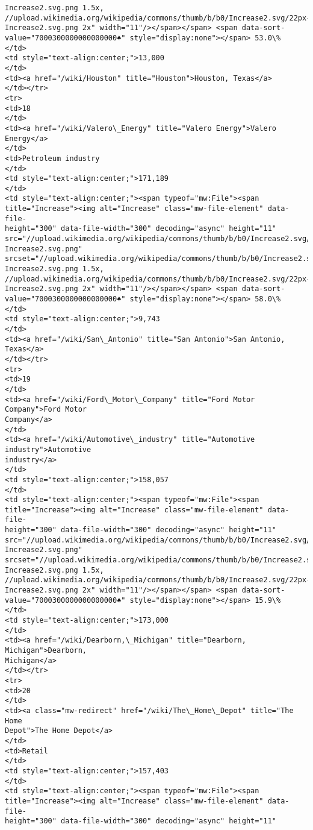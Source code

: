 \documentclass[11pt]{article}
\begin{document}
\begin{Verbatim}[commandchars=\\\{\}]
Increase2.svg.png 1.5x,
//upload.wikimedia.org/wikipedia/commons/thumb/b/b0/Increase2.svg/22px-
Increase2.svg.png 2x" width="11"/></span></span> <span data-sort-
value="7000300000000000000♠" style="display:none"></span> 53.0\%
</td>
<td style="text-align:center;">13,000
</td>
<td><a href="/wiki/Houston" title="Houston">Houston, Texas</a>
</td></tr>
<tr>
<td>18
</td>
<td><a href="/wiki/Valero\_Energy" title="Valero Energy">Valero Energy</a>
</td>
<td>Petroleum industry
</td>
<td style="text-align:center;">171,189
</td>
<td style="text-align:center;"><span typeof="mw:File"><span
title="Increase"><img alt="Increase" class="mw-file-element" data-file-
height="300" data-file-width="300" decoding="async" height="11"
src="//upload.wikimedia.org/wikipedia/commons/thumb/b/b0/Increase2.svg/11px-
Increase2.svg.png"
srcset="//upload.wikimedia.org/wikipedia/commons/thumb/b/b0/Increase2.svg/17px-
Increase2.svg.png 1.5x,
//upload.wikimedia.org/wikipedia/commons/thumb/b/b0/Increase2.svg/22px-
Increase2.svg.png 2x" width="11"/></span></span> <span data-sort-
value="7000300000000000000♠" style="display:none"></span> 58.0\%
</td>
<td style="text-align:center;">9,743
</td>
<td><a href="/wiki/San\_Antonio" title="San Antonio">San Antonio, Texas</a>
</td></tr>
<tr>
<td>19
</td>
<td><a href="/wiki/Ford\_Motor\_Company" title="Ford Motor Company">Ford Motor
Company</a>
</td>
<td><a href="/wiki/Automotive\_industry" title="Automotive industry">Automotive
industry</a>
</td>
<td style="text-align:center;">158,057
</td>
<td style="text-align:center;"><span typeof="mw:File"><span
title="Increase"><img alt="Increase" class="mw-file-element" data-file-
height="300" data-file-width="300" decoding="async" height="11"
src="//upload.wikimedia.org/wikipedia/commons/thumb/b/b0/Increase2.svg/11px-
Increase2.svg.png"
srcset="//upload.wikimedia.org/wikipedia/commons/thumb/b/b0/Increase2.svg/17px-
Increase2.svg.png 1.5x,
//upload.wikimedia.org/wikipedia/commons/thumb/b/b0/Increase2.svg/22px-
Increase2.svg.png 2x" width="11"/></span></span> <span data-sort-
value="7000300000000000000♠" style="display:none"></span> 15.9\%
</td>
<td style="text-align:center;">173,000
</td>
<td><a href="/wiki/Dearborn,\_Michigan" title="Dearborn, Michigan">Dearborn,
Michigan</a>
</td></tr>
<tr>
<td>20
</td>
<td><a class="mw-redirect" href="/wiki/The\_Home\_Depot" title="The Home
Depot">The Home Depot</a>
</td>
<td>Retail
</td>
<td style="text-align:center;">157,403
</td>
<td style="text-align:center;"><span typeof="mw:File"><span
title="Increase"><img alt="Increase" class="mw-file-element" data-file-
height="300" data-file-width="300" decoding="async" height="11"

\end{Verbatim}
\end{document}
